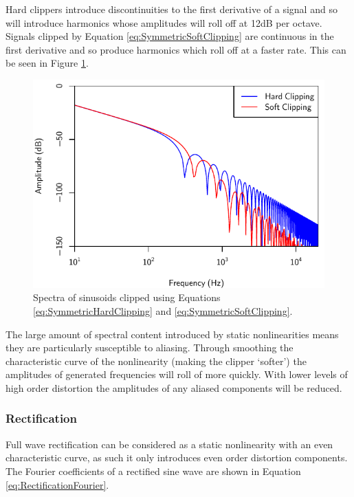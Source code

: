 			Hard clippers introduce discontinuities to the first derivative of a signal and so will introduce
			harmonics whose amplitudes will roll off at 12dB per octave. Signals clipped by Equation
			\ref{eq:SymmetricSoftClipping} are continuous in the first derivative and so produce harmonics
			which roll off at a faster rate. This can be seen in Figure \ref{fig:ClippingSpectra}.

			\begin{figure}[h!]
				\centering
				\includegraphics{chapter5/Images/ClippingSpectra.pdf}
				\caption{Spectra of sinusoids clipped using Equations \ref{eq:SymmetricHardClipping} and
			                 \ref{eq:SymmetricSoftClipping}.}
				\label{fig:ClippingSpectra}
			\end{figure}

			The large amount of spectral content introduced by static nonlinearities means they are
			particularly susceptible to aliasing. Through smoothing the characteristic curve of the
			nonlinearity (making the clipper `softer') the amplitudes of generated frequencies will roll of
			more quickly. With lower levels of high order distortion the amplitudes of any aliased components
			will be reduced.

		\subsubsection*{Rectification}
			Full wave rectification can be considered as a static nonlinearity with an even characteristic
			curve, as such it only introduces even order distortion components. The Fourier coefficients of a
			rectified sine wave are shown in Equation \ref{eq:RectificationFourier}.


